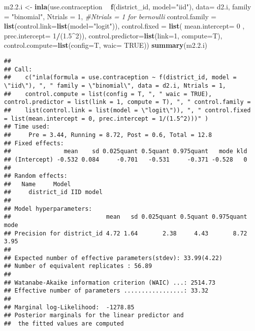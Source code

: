 \documentclass[
]{article}
\newenvironment{Shaded}{\begin{snugshade}}{\end{snugshade}}
\newcommand{\CommentTok}[1]{\textcolor[rgb]{0.56,0.35,0.01}{\textit{#1}}}
\newcommand{\DataTypeTok}[1]{\textcolor[rgb]{0.13,0.29,0.53}{#1}}
\newcommand{\DecValTok}[1]{\textcolor[rgb]{0.00,0.00,0.81}{#1}}
\newcommand{\FloatTok}[1]{\textcolor[rgb]{0.00,0.00,0.81}{#1}}
\newcommand{\KeywordTok}[1]{\textcolor[rgb]{0.13,0.29,0.53}{\textbf{#1}}}
\newcommand{\NormalTok}[1]{#1}
\newcommand{\OperatorTok}[1]{\textcolor[rgb]{0.81,0.36,0.00}{\textbf{#1}}}
\newcommand{\OtherTok}[1]{\textcolor[rgb]{0.56,0.35,0.01}{#1}}
\newcommand{\StringTok}[1]{\textcolor[rgb]{0.31,0.60,0.02}{#1}}
\begin{document}
\begin{Shaded}
\begin{Highlighting}[]
\NormalTok{m2.}\FloatTok{2.}\NormalTok{i <-}\StringTok{ }\KeywordTok{inla}\NormalTok{(use.contraception }\OperatorTok{~}\StringTok{ }\KeywordTok{f}\NormalTok{(district_id, }\DataTypeTok{model=}\StringTok{"iid"}\NormalTok{), }\DataTypeTok{data=}\NormalTok{ d2.i, }\DataTypeTok{family =} \StringTok{"binomial"}\NormalTok{, }
              \DataTypeTok{Ntrials =} \DecValTok{1}\NormalTok{, }\CommentTok{#Ntrials = 1 for bernoulli}
              \DataTypeTok{control.family =} \KeywordTok{list}\NormalTok{(}\DataTypeTok{control.link=}\KeywordTok{list}\NormalTok{(}\DataTypeTok{model=}\StringTok{"logit"}\NormalTok{)),}
              \DataTypeTok{control.fixed =} \KeywordTok{list}\NormalTok{(}
        \DataTypeTok{mean.intercept=}  \DecValTok{0}\NormalTok{ ,}
        \DataTypeTok{prec.intercept=} \DecValTok{1}\OperatorTok{/}\NormalTok{(}\FloatTok{1.5}\OperatorTok{^}\DecValTok{2}\NormalTok{)),}
              \DataTypeTok{control.predictor=}\KeywordTok{list}\NormalTok{(}\DataTypeTok{link=}\DecValTok{1}\NormalTok{, }\DataTypeTok{compute=}\NormalTok{T),}
              \DataTypeTok{control.compute=}\KeywordTok{list}\NormalTok{(}\DataTypeTok{config=}\NormalTok{T, }\DataTypeTok{waic=} \OtherTok{TRUE}\NormalTok{))}
\KeywordTok{summary}\NormalTok{(m2.}\FloatTok{2.}\NormalTok{i)}
\end{Highlighting}
\end{Shaded}

\begin{verbatim}
## 
## Call:
##    c("inla(formula = use.contraception ~ f(district_id, model = \"iid\"), ", " family = \"binomial\", data = d2.i, Ntrials = 1, 
##    control.compute = list(config = T, ", " waic = TRUE), control.predictor = list(link = 1, compute = T), ", " control.family = 
##    list(control.link = list(model = \"logit\")), ", " control.fixed = list(mean.intercept = 0, prec.intercept = 1/(1.5^2)))" ) 
## Time used:
##     Pre = 3.44, Running = 8.72, Post = 0.6, Total = 12.8 
## Fixed effects:
##               mean    sd 0.025quant 0.5quant 0.975quant   mode kld
## (Intercept) -0.532 0.084     -0.701   -0.531     -0.371 -0.528   0
## 
## Random effects:
##   Name     Model
##     district_id IID model
## 
## Model hyperparameters:
##                           mean   sd 0.025quant 0.5quant 0.975quant mode
## Precision for district_id 4.72 1.64       2.38     4.43       8.72 3.95
## 
## Expected number of effective parameters(stdev): 33.99(4.22)
## Number of equivalent replicates : 56.89 
## 
## Watanabe-Akaike information criterion (WAIC) ...: 2514.73
## Effective number of parameters .................: 33.32
## 
## Marginal log-Likelihood:  -1278.85 
## Posterior marginals for the linear predictor and
##  the fitted values are computed
\end{verbatim}
\end{document}
